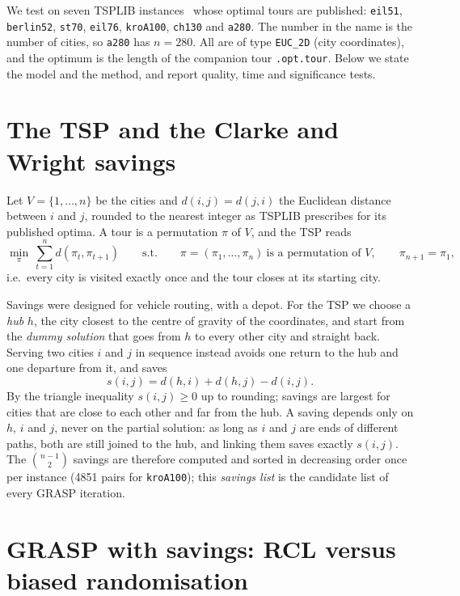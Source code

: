 \documentclass[10pt,a4paper]{article}
\begin{document}
We test on seven TSPLIB instances~\cite{tsplib} whose optimal tours are published:
\texttt{eil51}, \texttt{berlin52}, \texttt{st70}, \texttt{eil76}, \texttt{kroA100}, \texttt{ch130}
and \texttt{a280}. The number in the name is the number of cities, so \texttt{a280} has $n=280$. All are of type \texttt{EUC\_2D} (city coordinates), and the optimum is the length of the companion tour \texttt{.opt.tour}. Below we state the model and the method, and report quality, time and significance tests.

\section{The TSP and the Clarke and Wright savings}
\label{sec:model}

Let $V=\{1,\dots,n\}$ be the cities and $d(i,j)=d(j,i)$ the Euclidean distance between $i$ and $j$,
rounded to the nearest integer as TSPLIB prescribes for its published optima. A tour is a permutation $\pi$ of $V$, and the TSP reads
\begin{equation}
\min_{\pi}\ \sum_{t=1}^{n} d(\pi_t,\pi_{t+1})
\qquad\text{s.t.}\qquad
\pi=(\pi_1,\dots,\pi_n)\ \text{is a permutation of } V,\qquad \pi_{n+1}=\pi_1 ,
\label{eq:model}
\end{equation}
i.e.\ every city is visited exactly once and the tour closes at its starting city.

Savings were designed for vehicle routing, with a depot. For the TSP we choose a
\emph{hub} $h$, the city closest to the centre of gravity of the coordinates, and start from the
\emph{dummy solution} that goes from $h$ to every other city and straight back. Serving two cities $i$ and
$j$ in sequence instead avoids one return to the hub and one departure from it, and saves
\begin{equation}
s(i,j) = d(h,i) + d(h,j) - d(i,j).
\label{eq:savings}
\end{equation}
By the triangle inequality $s(i,j)\ge0$ up to rounding; savings are largest for cities that are close
to each other and far from the hub. A saving depends only on $h$, $i$ and $j$, never on the partial
solution: as long as $i$ and $j$ are ends of different paths, both are still joined to the hub, and
linking them saves exactly $s(i,j)$. The $\binom{n-1}{2}$ savings are therefore computed and sorted in
decreasing order once per instance (4851 pairs for \texttt{kroA100}); this \emph{savings list} is the
candidate list of every GRASP iteration.

\section{GRASP with savings: RCL versus biased randomisation}
\label{sec:method}
\end{document}
